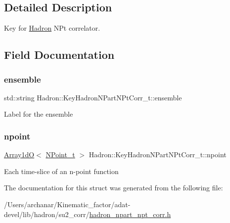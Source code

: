 \subsection{Detailed Description}
Key for \mbox{\hyperlink{namespaceHadron}{Hadron}} N\+Pt correlator. 

\subsection{Field Documentation}
\mbox{\label{structHadron_1_1KeyHadronNPartNPtCorr__t_a39e829b0115935227246882dee1a2365}} 
\subsubsection{\texorpdfstring{ensemble}{ensemble}}
{\footnotesize\ttfamily std\+::string Hadron\+::\+Key\+Hadron\+N\+Part\+N\+Pt\+Corr\+\_\+t\+::ensemble}

Label for the ensemble \mbox{\label{structHadron_1_1KeyHadronNPartNPtCorr__t_aa2c10fa6d139966599ca71514a4a85a7}} 
\subsubsection{\texorpdfstring{npoint}{npoint}}
{\footnotesize\ttfamily \mbox{\hyperlink{classADAT_1_1Array1dO}{Array1dO}}$<$ \mbox{\hyperlink{structHadron_1_1KeyHadronNPartNPtCorr__t_1_1NPoint__t}{N\+Point\+\_\+t}} $>$ Hadron\+::\+Key\+Hadron\+N\+Part\+N\+Pt\+Corr\+\_\+t\+::npoint}

Each time-\/slice of an n-\/point function 

The documentation for this struct was generated from the following file\+:\begin{DoxyCompactItemize}
\item 
/\+Users/archanar/\+Kinematic\+\_\+factor/adat-\/devel/lib/hadron/su2\+\_\+corr/\mbox{\hyperlink{adat-devel_2lib_2hadron_2su2__corr_2hadron__npart__npt__corr_8h}{hadron\+\_\+npart\+\_\+npt\+\_\+corr.\+h}}\end{DoxyCompactItemize}
